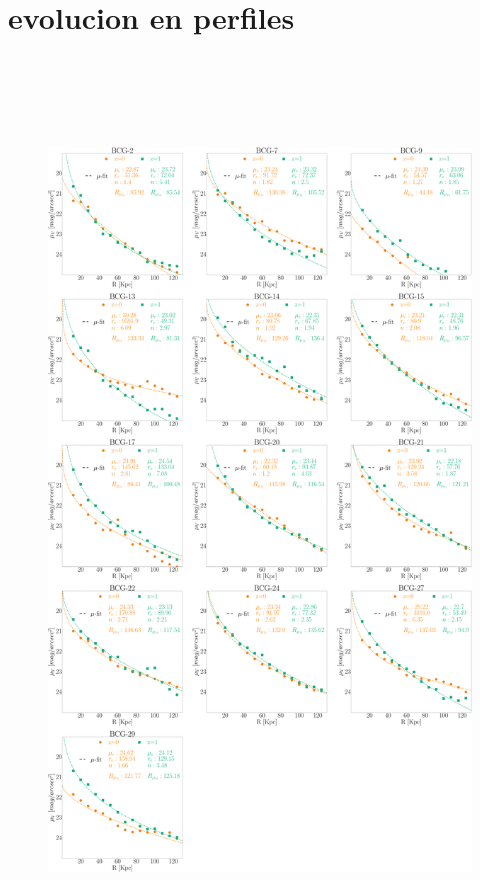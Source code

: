 \section{evolucion en perfiles}

\begin{figure}[H]
 \includegraphics[height=24cm, width=15cm]{../al_final/plots/perfiles/bajustes_mues.pdf}
\end{figure}

